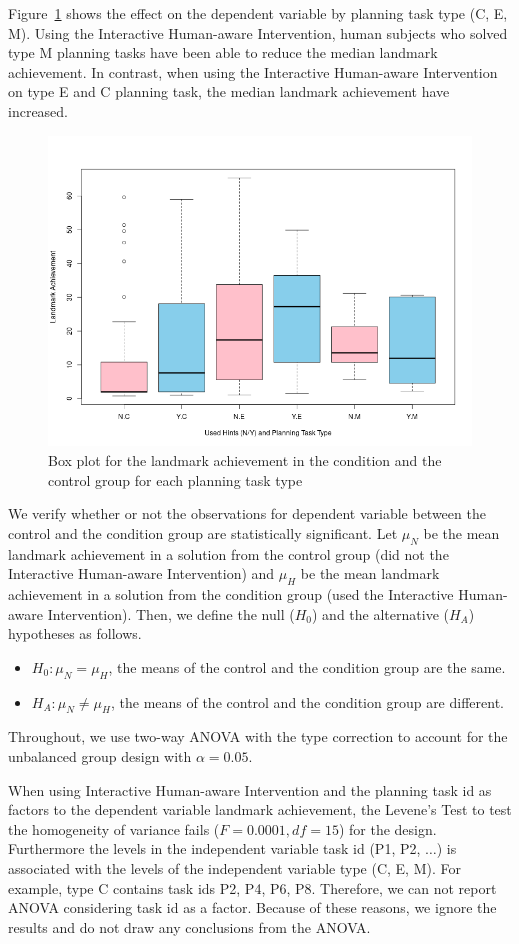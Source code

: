 Figure~\ref{fig:achbytype} shows the effect on the dependent variable by planning task type (C, E, M).
Using the Interactive Human-aware Intervention, human subjects who solved type M planning tasks have been able to reduce the median landmark achievement.
In contrast, when using the Interactive Human-aware Intervention on type E and C planning task, the median landmark achievement have increased.
\begin{figure}[tpb]
  \centering
\includegraphics[width=0.7\columnwidth]{img/achbytype.png}
  \caption{Box plot for the landmark achievement in the condition and the control group for each planning task type}
  \label{fig:achbytype}
\end{figure}

We verify whether or not the observations for dependent variable between the control and the condition group are statistically significant.
Let $\mu_N$ be the mean landmark achievement in a solution from the control group (did not the Interactive Human-aware Intervention) and $\mu_H$ be the mean landmark achievement in a solution from the condition group (used the Interactive Human-aware Intervention).
Then, we define the null ($H_0$) and the alternative ($H_A$) hypotheses as follows.
\begin{itemize}
\item $H_0: \mu_N = \mu_H$, the means of the control and the condition group are the same.
\item $H_A: \mu_N \neq \mu_H$, the means of the control and the condition group are different.
\end{itemize}
Throughout, we use two-way ANOVA with the type  correction to account for the unbalanced group design with $\alpha=0.05$.

When using Interactive Human-aware Intervention and the planning task id as factors to the dependent variable landmark achievement, the Levene's Test to test the homogeneity of variance fails ($F=0.0001, df=15$) for the design.
Furthermore the levels in the independent variable task id (P1, P2, $\ldots$) is associated with the levels of the independent variable type (C, E, M).
For example, type C contains task ids P2, P4, P6, P8.
Therefore, we can not report ANOVA considering task id as a factor.
Because of these reasons, we ignore the results and do not draw any conclusions from the ANOVA.

